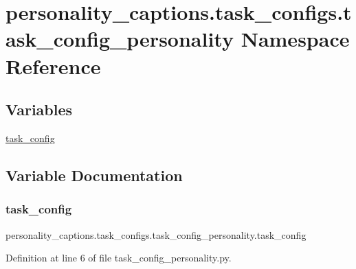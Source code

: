 \hypertarget{namespacepersonality__captions_1_1task__configs_1_1task__config__personality}{}\section{personality\+\_\+captions.\+task\+\_\+configs.\+task\+\_\+config\+\_\+personality Namespace Reference}
\label{namespacepersonality__captions_1_1task__configs_1_1task__config__personality}
\subsection*{Variables}
\begin{DoxyCompactItemize}
\item 
\hyperlink{namespacepersonality__captions_1_1task__configs_1_1task__config__personality_ae2d502818364171a28f8d13e6d6df8d1}{task\+\_\+config}
\end{DoxyCompactItemize}


\subsection{Variable Documentation}
\mbox{\label{namespacepersonality__captions_1_1task__configs_1_1task__config__personality_ae2d502818364171a28f8d13e6d6df8d1}} 
\subsubsection{\texorpdfstring{task\+\_\+config}{task\_config}}
{\footnotesize\ttfamily personality\+\_\+captions.\+task\+\_\+configs.\+task\+\_\+config\+\_\+personality.\+task\+\_\+config}



Definition at line 6 of file task\+\_\+config\+\_\+personality.\+py.

